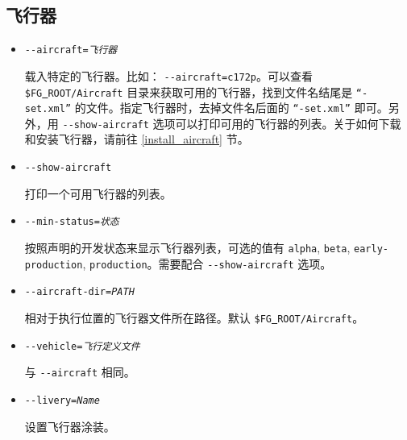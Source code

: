 \ifchinese
{
  \subsection{飞行器}
\begin{itemize}
\item{\texttt{-$ $-aircraft={\it 飞行器}}}
   
   载入特定的飞行器。比如： \texttt{-$ $-aircraft=c172p}。可以查看 \texttt{\$FG\underline{~}ROOT/Aircraft} 目录来获取可用的飞行器，找到文件名结尾是 \texttt{``-set.xml''} 的文件。指定飞行器时，去掉文件名后面的 \texttt{``-set.xml''} 即可。另外，用 \texttt{-$ $-show-aircraft} 选项可以打印可用的飞行器的列表。关于如何下载和安装飞行器，请前往 \ref{install_aircraft} 节。

\item{\texttt{-$ $-show-aircraft}}

  打印一个可用飞行器的列表。

\item{\texttt{-$ $-min-status={\it 状态}}}

  按照声明的开发状态来显示飞行器列表，可选的值有 \texttt{alpha}, \texttt{beta}, \texttt{early-production}, \texttt{production}。需要配合 \texttt{-$ $-show-aircraft} 选项。

\item{\texttt{-$ $-aircraft-dir={\it PATH}}}

  相对于执行位置的飞行器文件所在路径。默认 \texttt{\$FG\underline{~}ROOT/Aircraft}。

\item{\texttt{-$ $-vehicle={\it 飞行定义文件}}}

  与 \texttt{-$ $-aircraft} 相同。

  \item{\texttt{-$ $-livery={\it Name}}}

  设置飞行器涂装。

  \end{itemize}
}
\fi


